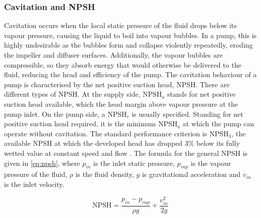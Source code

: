 \subsubsection{Cavitation and NPSH}
Cavitation occurs when the local static pressure of the fluid drops below its vapour pressure, causing the liquid to boil into vapour bubbles. In a pump, this is highly undesirable as the bubbles form and collapse violently repeatedly, eroding the impeller and diffuser surfaces. Additionally, the vapour bubbles are compressible, so they absorb energy that would otherwise be delivered to the fluid, reducing the head and efficiency of the pump. The cavitation behaviour of a pump is characterised by the net positive suction head, NPSH. There are different types of NPSH. At the supply side, $\textrm{NPSH}_a$ stands for net positive suction head available, which the head margin above vapour pressure at the pump inlet. On the pump side, a  $\textrm{NPSH}_r$ is usually specified. Standing for net positive suction head required, it is the minimum NPSH$_a$ at which the pump can operate without cavitation. The standard performance criterion is NPSH$_3$, the available NPSH at which the developed head has dropped 3\% below its fully wetted value at constant speed and flow \cite{gulichCentrifugalPumps2020}. The formula for the general NPSH is given in \cref{eq:npsh}, where $p_{in}$ is the inlet static pressure, $p_{vap}$ is the vapour pressure of the fluid, $\rho$ is the fluid density, $g$ is gravitational acceleration and $v_{in}$ is the inlet velocity.

\begin{equation}
    \textrm{NPSH} = \frac{p_{in} - p_{vap}}{\rho g} + \frac{v_{in}^2}{2g}
    \label{eq:npsh}
\end{equation}



